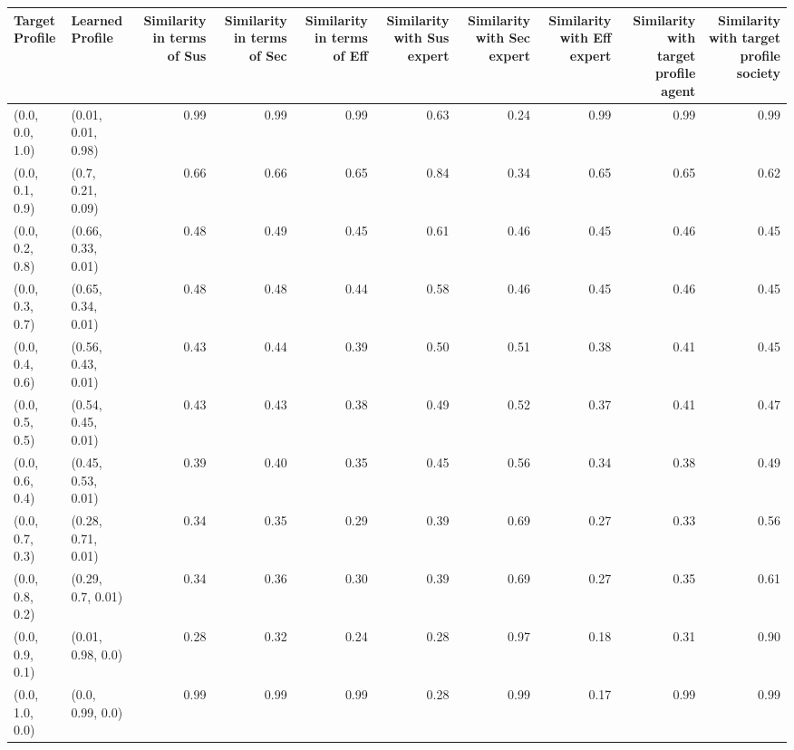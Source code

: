 \begin{tabular}{llrrrrrrrr}
\toprule
Target Profile & Learned Profile & Similarity in terms of Sus & Similarity in terms of Sec & Similarity in terms of Eff & Similarity with Sus expert & Similarity with Sec expert & Similarity with Eff expert & Similarity with target profile agent & Similarity with target profile society \\
\midrule
(0.0, 0.0, 1.0) & (0.01, 0.01, 0.98) & 0.99 & 0.99 & 0.99 & 0.63 & 0.24 & 0.99 & 0.99 & 0.99 \\
(0.0, 0.1, 0.9) & (0.7, 0.21, 0.09) & 0.66 & 0.66 & 0.65 & 0.84 & 0.34 & 0.65 & 0.65 & 0.62 \\
(0.0, 0.2, 0.8) & (0.66, 0.33, 0.01) & 0.48 & 0.49 & 0.45 & 0.61 & 0.46 & 0.45 & 0.46 & 0.45 \\
(0.0, 0.3, 0.7) & (0.65, 0.34, 0.01) & 0.48 & 0.48 & 0.44 & 0.58 & 0.46 & 0.45 & 0.46 & 0.45 \\
(0.0, 0.4, 0.6) & (0.56, 0.43, 0.01) & 0.43 & 0.44 & 0.39 & 0.50 & 0.51 & 0.38 & 0.41 & 0.45 \\
(0.0, 0.5, 0.5) & (0.54, 0.45, 0.01) & 0.43 & 0.43 & 0.38 & 0.49 & 0.52 & 0.37 & 0.41 & 0.47 \\
(0.0, 0.6, 0.4) & (0.45, 0.53, 0.01) & 0.39 & 0.40 & 0.35 & 0.45 & 0.56 & 0.34 & 0.38 & 0.49 \\
(0.0, 0.7, 0.3) & (0.28, 0.71, 0.01) & 0.34 & 0.35 & 0.29 & 0.39 & 0.69 & 0.27 & 0.33 & 0.56 \\
(0.0, 0.8, 0.2) & (0.29, 0.7, 0.01) & 0.34 & 0.36 & 0.30 & 0.39 & 0.69 & 0.27 & 0.35 & 0.61 \\
(0.0, 0.9, 0.1) & (0.01, 0.98, 0.0) & 0.28 & 0.32 & 0.24 & 0.28 & 0.97 & 0.18 & 0.31 & 0.90 \\
(0.0, 1.0, 0.0) & (0.0, 0.99, 0.0) & 0.99 & 0.99 & 0.99 & 0.28 & 0.99 & 0.17 & 0.99 & 0.99 \\
\bottomrule
\end{tabular}
